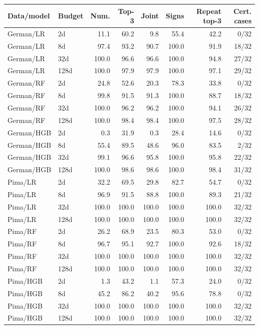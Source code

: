 \begin{tabular}{llrrrrrr}
\toprule
Data/model & Budget & Num. & Top-3 & Joint & Signs & Repeat top-3 & Cert. cases \\
\midrule
German/LR & 2d & 11.1 & 60.2 & 9.8 & 55.4 & 42.2 & 0/32 \\
German/LR & 8d & 97.4 & 93.2 & 90.7 & 100.0 & 91.9 & 18/32 \\
German/LR & 32d & 100.0 & 96.6 & 96.6 & 100.0 & 94.8 & 27/32 \\
German/LR & 128d & 100.0 & 97.9 & 97.9 & 100.0 & 97.1 & 29/32 \\
German/RF & 2d & 24.8 & 52.6 & 20.3 & 78.3 & 33.8 & 0/32 \\
German/RF & 8d & 99.8 & 91.5 & 91.3 & 100.0 & 88.7 & 18/32 \\
German/RF & 32d & 100.0 & 96.2 & 96.2 & 100.0 & 94.1 & 26/32 \\
German/RF & 128d & 100.0 & 98.4 & 98.4 & 100.0 & 97.5 & 28/32 \\
German/HGB & 2d & 0.3 & 31.9 & 0.3 & 28.4 & 14.6 & 0/32 \\
German/HGB & 8d & 55.4 & 89.5 & 48.6 & 96.0 & 83.5 & 2/32 \\
German/HGB & 32d & 99.1 & 96.6 & 95.8 & 100.0 & 95.8 & 22/32 \\
German/HGB & 128d & 100.0 & 98.6 & 98.6 & 100.0 & 98.4 & 31/32 \\
Pima/LR & 2d & 32.2 & 69.5 & 29.8 & 82.7 & 54.7 & 0/32 \\
Pima/LR & 8d & 96.9 & 91.5 & 88.8 & 100.0 & 89.3 & 21/32 \\
Pima/LR & 32d & 100.0 & 100.0 & 100.0 & 100.0 & 100.0 & 32/32 \\
Pima/LR & 128d & 100.0 & 100.0 & 100.0 & 100.0 & 100.0 & 32/32 \\
Pima/RF & 2d & 26.2 & 68.9 & 23.5 & 80.3 & 53.0 & 0/32 \\
Pima/RF & 8d & 96.7 & 95.1 & 92.7 & 100.0 & 92.6 & 18/32 \\
Pima/RF & 32d & 100.0 & 100.0 & 100.0 & 100.0 & 100.0 & 32/32 \\
Pima/RF & 128d & 100.0 & 100.0 & 100.0 & 100.0 & 100.0 & 32/32 \\
Pima/HGB & 2d & 1.3 & 43.2 & 1.1 & 57.3 & 24.0 & 0/32 \\
Pima/HGB & 8d & 45.2 & 86.2 & 40.2 & 95.6 & 78.8 & 0/32 \\
Pima/HGB & 32d & 100.0 & 100.0 & 100.0 & 100.0 & 100.0 & 32/32 \\
Pima/HGB & 128d & 100.0 & 100.0 & 100.0 & 100.0 & 100.0 & 32/32 \\

\end{tabular}
